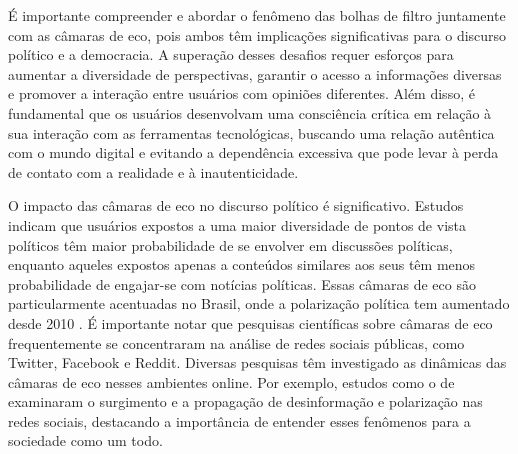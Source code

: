 É importante compreender e abordar o fenômeno das bolhas de filtro juntamente com as câmaras de eco, pois ambos têm implicações significativas para o discurso político e a democracia. A superação desses desafios requer esforços para aumentar a diversidade de perspectivas, garantir o acesso a informações diversas e promover a interação entre usuários com opiniões diferentes. Além disso, é fundamental que os usuários desenvolvam uma consciência crítica em relação à sua interação com as ferramentas tecnológicas, buscando uma relação autêntica com o mundo digital e evitando a dependência excessiva que pode levar à perda de contato com a realidade e à inautenticidade.

O impacto das câmaras de eco no discurso político é significativo. Estudos indicam que usuários expostos a uma maior diversidade de pontos de vista políticos têm maior probabilidade de se envolver em discussões políticas, enquanto aqueles expostos apenas a conteúdos similares aos seus têm menos probabilidade de engajar-se com notícias políticas. Essas câmaras de eco são particularmente acentuadas no Brasil, onde a polarização política tem aumentado desde 2010 \cite{2022_Ortellado}. É importante notar que pesquisas científicas sobre câmaras de eco frequentemente se concentraram na análise de redes sociais públicas, como Twitter, Facebook e Reddit. Diversas pesquisas têm investigado as dinâmicas das câmaras de eco nesses ambientes online. Por exemplo, estudos como o de \cite[p. 224]{2016_Vicario} examinaram o surgimento e a propagação de desinformação e polarização nas redes sociais, destacando a importância de entender esses fenômenos para a sociedade como um todo.

